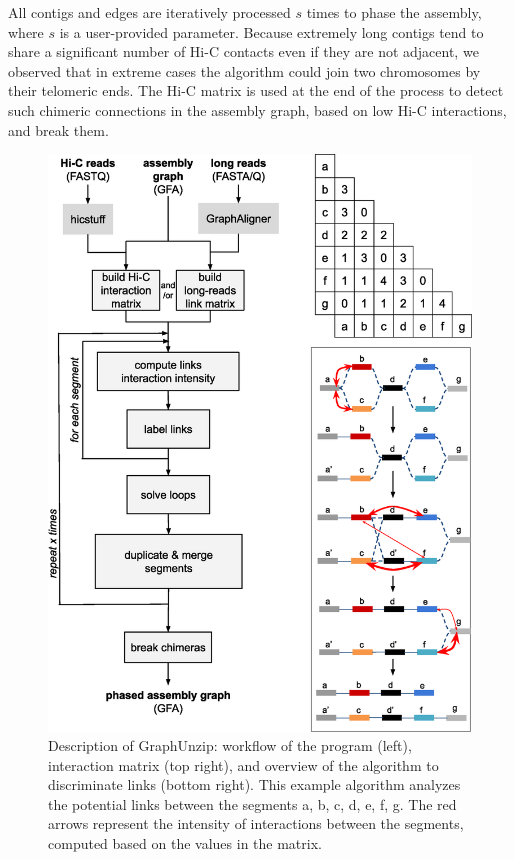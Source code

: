 All contigs and edges are iteratively processed $s$ times to phase the assembly, where $s$ is a user-provided parameter. Because extremely long contigs tend to share a significant number of Hi-C contacts even if they are not adjacent, we observed that in extreme cases the algorithm could join two chromosomes by their telomeric ends. The Hi-C matrix is used at the end of the process to detect such chimeric connections in the assembly graph, based on low Hi-C interactions, and break them. \\

\begin{figure}
    \centering
    \includegraphics[width=16cm]{fig/graphunzip_description.eps}
    \caption{\label{principle} Description of GraphUnzip: workflow of the program (left), interaction matrix (top right), and overview of the algorithm to discriminate links (bottom right). This example algorithm analyzes the potential links between the segments a, b, c, d, e, f, g. The red arrows represent the intensity of interactions between the segments, computed based on the values in the matrix.}
\end{figure}

